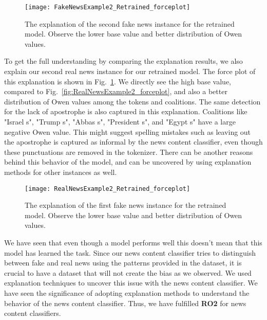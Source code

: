 \begin{figure}
    \centering
    \texttt{[image: FakeNewsExample2\_Retrained\_forceplot]}
    \caption[The explanation of the second fake news instance for the retrained model.]{The explanation of the second fake news instance for the retrained model. Observe the lower base value and better distribution of Owen values.}
    \label{fig:FakeNewsExample2_Retrained_forceplot}
\end{figure}
To get the full understanding by comparing the explanation results, we also explain our second real news instance for our retrained model. The force plot of this explanation is shown in Fig.~\ref{fig:FakeNewsExample2_Retrained_forceplot}. We directly see the high base value, compared to Fig.~\ref{fig:RealNewsExample2_forceplot}, and also a better distribution of Owen values among the tokens and coalitions. The same detection for the lack of apostrophe is also captured in this explanation. Coalitions like "Israel s", "Trump s", "Abbas s", "President s", and "Egypt s" have a large negative Owen value. This might suggest spelling mistakes such as leaving out the apostrophe is captured as informal by the news content classifier, even though these punctuations are removed in the tokenizer. There can be another reasons behind this behavior of the model, and can be uncovered by using explanation methods for other instances as well.
\begin{figure}
    \centering
    \texttt{[image: RealNewsExample2\_Retrained\_forceplot]}
    \caption[The explanation of the first fake news instance for the retrained model.]{The explanation of the first fake news instance for the retrained model. Observe the lower base value and better distribution of Owen values.}
    \label{fig:RealNewsExample2_Retrained_forceplot}
\end{figure}
We have seen that even though a model performs well this doesn't mean that this model has learned the task. Since our news content classifier tries to distinguish between fake and real news using the patterns provided in the dataset, it is crucial to have a dataset that will not create the bias as we observed. We used explanation techniques to uncover this issue with the news content classifier. We have seen the significance of adopting explanation methods to understand the behavior of the news content classifier. Thus, we have fulfilled \textbf{RO2} for news content classifiers.\\
